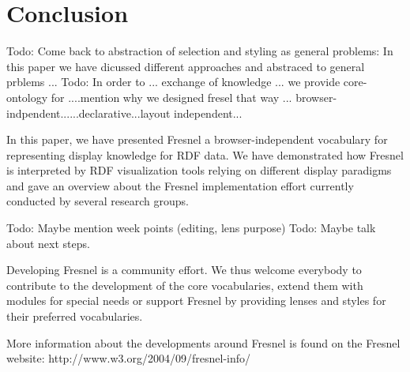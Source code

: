 \section{Conclusion}



Todo: Come back to abstraction of selection and styling as general problems: In this paper we have dicussed different approaches and abstraced to general prblems ...
Todo: In order to ... exchange of knowledge ... we provide core-ontology for ....mention why we designed fresel that way ... browser-indpendent......declarative...layout independent...

In this paper, we have presented Fresnel a browser-independent vocabulary for representing display knowledge for RDF data. We have demonstrated how Fresnel is interpreted by RDF visualization tools relying on different display paradigms and gave an overview about the Fresnel implementation effort currently conducted by several research groups. 

Todo: Maybe mention week points (editing, lens purpose)
Todo: Maybe talk about next steps.

Developing Fresnel is a community effort. We thus welcome everybody to contribute to the development of the core vocabularies, extend them with modules for special needs or support Fresnel by providing lenses and styles for their preferred vocabularies.

More information about the developments around Fresnel is found on the Fresnel website: http://www.w3.org/2004/09/fresnel-info/


